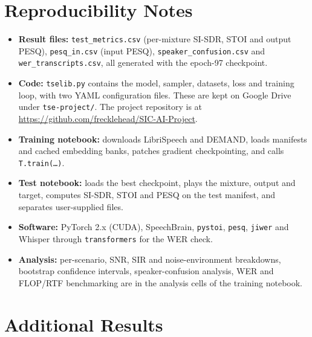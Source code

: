 \documentclass[11pt,a4paper]{article}
\newcommand{\sisdr}{SI-SDR}
\begin{document}

\setlength{\bibsep}{2pt}


\appendix

\section{Reproducibility Notes}
\label{app:repro}
\begin{itemize}
  \item \textbf{Result files:} \texttt{test\_metrics.csv} (per-mixture \sisdr, STOI and output
        PESQ), \texttt{pesq\_in.csv} (input PESQ), \texttt{speaker\_confusion.csv} and
        \texttt{wer\_transcripts.csv}, all generated with the epoch-97 checkpoint.
  \item \textbf{Code:} \texttt{tselib.py} contains the model, sampler, datasets, loss and training
        loop, with two YAML configuration files. These are kept on Google Drive under
        \texttt{tse-project/}. The project repository is at
        \url{https://github.com/frecklehead/SIC-AI-Project}.
  \item \textbf{Training notebook:} downloads LibriSpeech and DEMAND, loads manifests and cached
        embedding banks, patches gradient checkpointing, and calls \texttt{T.train(\ldots)}.
  \item \textbf{Test notebook:} loads the best checkpoint, plays the mixture, output and target,
        computes \sisdr, STOI and PESQ on the test manifest, and separates user-supplied files.
  \item \textbf{Software:} PyTorch 2.x (CUDA), SpeechBrain, \texttt{pystoi}, \texttt{pesq},
        \texttt{jiwer} and Whisper through \texttt{transformers} for the WER check.
  \item \textbf{Analysis:} per-scenario, SNR, SIR and noise-environment breakdowns, bootstrap
        confidence intervals, speaker-confusion analysis, WER and FLOP/RTF benchmarking are in the
        analysis cells of the training notebook.
\end{itemize}

\section{Additional Results}
\label{app:breakdowns}
\end{document}
